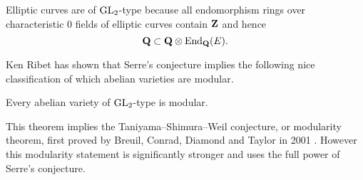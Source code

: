 \documentclass[a4paper,12pt]{article}
\begin{document}
\begin{ex}
Elliptic curves are of $\operatorname{GL}_2$-type because all endomorphism rings over characteristic 0 fields of elliptic curves contain $\mathbf{Z}$ and hence
\[
\mathbf{Q} \subset \mathbf{Q} \otimes \operatorname{End}_{\mathbf{Q}}(E).
\]
\end{ex}

Ken Ribet has shown \cite{Ribet04} that Serre's conjecture implies the following nice classification of which abelian varieties are modular.

\begin{thm}
Every abelian variety of $\operatorname{GL}_2$-type is modular.
\end{thm}

This theorem implies the Taniyama--Shimura--Weil conjecture, or modularity theorem, first proved by Breuil, Conrad, Diamond and Taylor in 2001 \cite{BCDT}.
However this modularity statement is significantly stronger and uses the full power of Serre's conjecture.




\end{document}
